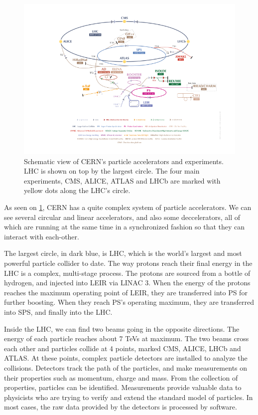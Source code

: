 \documentclass[12pt]{article}
\begin{document}
\begin{figure}[H]
	\includegraphics[width=\textwidth]{accelerator_complex}
	\caption{Schematic view of CERN's particle accelerators and experiments. LHC is shown on top by the largest circle. The four main experiments, CMS, ALICE, ATLAS and LHCb are marked with yellow dots along the LHC's circle.}
	\label{fig_accel_complex}
\end{figure}

As seen on \ref{fig_accel_complex}, CERN has a quite complex system of particle accelerators. We can see several circular and linear accelerators, and also some deccelerators, all of which are running at the same time in a synchronized fashion so that they can interact with each-other.

The largest circle, in dark blue, is LHC, which is the world's largest and most powerful particle collider to date. The way protons reach their final energy in the LHC is a complex, multi-stage process. The protons are sourced from a bottle of hydrogen, and injected into LEIR via LINAC 3. When the energy of the protons reaches the maximum operating point of LEIR, they are transferred into PS for further boosting. When they reach PS's operating maximum, they are transferred into SPS, and finally into the LHC.

Inside the LHC, we can find two beams going in the opposite directions. The energy of each particle reaches about 7 TeVs at maximum. The two beams cross each other and particles collide at 4 points, marked CMS, ALICE, LHCb and ATLAS. At these points, complex particle detectors are installed to analyze the collisions. Detectors track the path of the particles, and make measurements on their properties such as momentum, charge and mass. From the collection of properties, particles can be identified. Measurements provide valuable data to physicists who are trying to verify and extend the standard model of particles. In most cases, the raw data provided by the detectors is processed by software.
\end{document}
